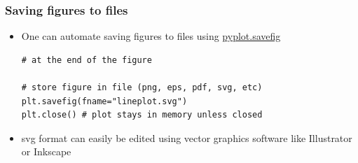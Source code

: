 \documentclass[xcolor=table]{beamer}
\begin{document}
\begin{frame}[fragile]
\frametitle{Saving figures to files}
    \begin{itemize}
        \item One can automate saving figures to files using \href{https://matplotlib.org/api/_as_gen/matplotlib.pyplot.savefig.html?highlight=pyplot%20savefig#matplotlib.pyplot.savefig}{pyplot.savefig}
\begin{lstlisting}[style=python]
# at the end of the figure

# store figure in file (png, eps, pdf, svg, etc)
plt.savefig(fname="lineplot.svg")
plt.close() # plot stays in memory unless closed
\end{lstlisting}
        \item svg format can easily be edited using vector graphics software like Illustrator or Inkscape
    \end{itemize}
\end{frame}

\end{document}
